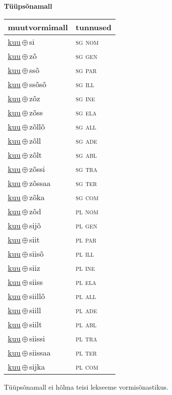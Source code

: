

\vspace{3.5em}
\noindent \begin{minipage}{\textwidth}
\noindent \textbf{Tüüpsõnamall \,}\\

\begin{sideways}
\begin{tabular}{l l}
muutvormimall & tunnused \\
\hline
\underline{kuu}\,$\oplus$\,si & \textsc{ sg nom } \\
\underline{kuu}\,$\oplus$\,zõ & \textsc{ sg gen } \\
\underline{kuu}\,$\oplus$\,ssõ & \textsc{ sg par } \\
\underline{kuu}\,$\oplus$\,ssõsõ & \textsc{ sg ill } \\
\underline{kuu}\,$\oplus$\,zõz & \textsc{ sg ine } \\
\underline{kuu}\,$\oplus$\,zõss & \textsc{ sg ela } \\
\underline{kuu}\,$\oplus$\,zõllõ & \textsc{ sg all } \\
\underline{kuu}\,$\oplus$\,zõll & \textsc{ sg ade } \\
\underline{kuu}\,$\oplus$\,zõlt & \textsc{ sg abl } \\
\underline{kuu}\,$\oplus$\,zõssi & \textsc{ sg tra } \\
\underline{kuu}\,$\oplus$\,zõssaa & \textsc{ sg ter } \\
\underline{kuu}\,$\oplus$\,zõka & \textsc{ sg com } \\
\underline{kuu}\,$\oplus$\,zõd & \textsc{ pl nom } \\
\underline{kuu}\,$\oplus$\,sijõ & \textsc{ pl gen } \\
\underline{kuu}\,$\oplus$\,siit & \textsc{ pl par } \\
\underline{kuu}\,$\oplus$\,siisõ & \textsc{ pl ill } \\
\underline{kuu}\,$\oplus$\,siiz & \textsc{ pl ine } \\
\underline{kuu}\,$\oplus$\,siiss & \textsc{ pl ela } \\
\underline{kuu}\,$\oplus$\,siillõ & \textsc{ pl all } \\
\underline{kuu}\,$\oplus$\,siill & \textsc{ pl ade } \\
\underline{kuu}\,$\oplus$\,siilt & \textsc{ pl abl } \\
\underline{kuu}\,$\oplus$\,siissi & \textsc{ pl tra } \\
\underline{kuu}\,$\oplus$\,siissaa & \textsc{ pl ter } \\
\underline{kuu}\,$\oplus$\,sijka & \textsc{ pl com } \\
\end{tabular}
\end{sideways}
\label{tab:tüüpsõnamall-kuusi}

\end{minipage}

 
\vspace{1em}
\noindent Tüüpsõnamall  ei hõlma teisi lekseeme vormi\-sõnastikus.
